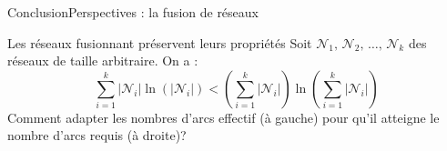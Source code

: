 \begin{frame}{Conclusion}{Perspectives : la fusion de réseaux}

  \begin{block}{Les réseaux fusionnant préservent leurs propriétés}
    Soit $\mathcal{N}_1,\, \mathcal{N}_2,\, \ldots ,\, \mathcal{N}_k$ des réseaux
    de taille arbitraire. On a : \vspace{-5pt}
    \begin{equation}
      \sum\limits_{i = 1}^k |\mathcal{N}_i|\ln (|\mathcal{N}_i|) < (\sum\limits_{i = 1}^k |\mathcal{N}_i|)\ln{(\sum\limits_{i=1}^k |\mathcal{N}_i|)}
    \end{equation}
    Comment adapter les nombres d'arcs effectif (à gauche) pour qu'il atteigne le
    nombre d'arcs requis (à droite)?
  \end{block}


\end{frame}
